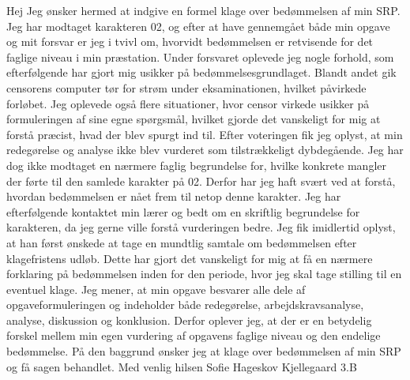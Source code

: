 Hej 
Jeg ønsker hermed at indgive en formel klage over bedømmelsen af min SRP. 
Jeg har modtaget karakteren 02, og efter at have gennemgået både min opgave og mit forsvar er jeg i 
tvivl om, hvorvidt bedømmelsen er retvisende for det faglige niveau i min præstation. 
Under forsvaret oplevede jeg nogle forhold, som efterfølgende har gjort mig usikker på 
bedømmelsesgrundlaget. Blandt andet gik censorens computer tør for strøm under eksaminationen, 
hvilket påvirkede forløbet. Jeg oplevede også flere situationer, hvor censor virkede usikker på 
formuleringen af sine egne spørgsmål, hvilket gjorde det vanskeligt for mig at forstå præcist, hvad der 
blev spurgt ind til. 
Efter voteringen fik jeg oplyst, at min redegørelse og analyse ikke blev vurderet som tilstrækkeligt 
dybdegående. Jeg har dog ikke modtaget en nærmere faglig begrundelse for, hvilke konkrete mangler 
der førte til den samlede karakter på 02. Derfor har jeg haft svært ved at forstå, hvordan bedømmelsen 
er nået frem til netop denne karakter. 
Jeg har efterfølgende kontaktet min lærer og bedt om en skriftlig begrundelse for karakteren, da jeg 
gerne ville forstå vurderingen bedre. Jeg fik imidlertid oplyst, at han først ønskede at tage en mundtlig 
samtale om bedømmelsen efter klagefristens udløb. Dette har gjort det vanskeligt for mig at få en 
nærmere forklaring på bedømmelsen inden for den periode, hvor jeg skal tage stilling til en eventuel 
klage. 
Jeg mener, at min opgave besvarer alle dele af opgaveformuleringen og indeholder både redegørelse, 
arbejdskravsanalyse, analyse, diskussion og konklusion. Derfor oplever jeg, at der er en betydelig forskel 
mellem min egen vurdering af opgavens faglige niveau og den endelige bedømmelse. 
På den baggrund ønsker jeg at klage over bedømmelsen af min SRP og få sagen behandlet. 
Med venlig hilsen 
Sofie Hageskov Kjellegaard 
3.B
